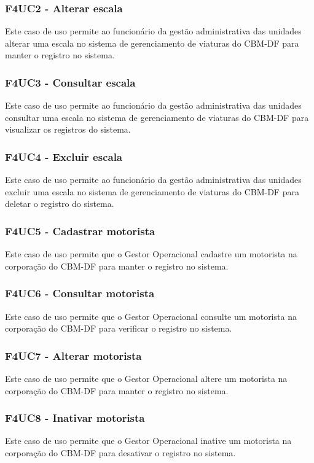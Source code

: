   \subsubsection{F4UC2 - Alterar escala}
Este caso de uso permite ao funcionário da gestão administrativa das unidades alterar uma escala no sistema de
gerenciamento de viaturas do CBM-DF para manter o registro no sistema.

  \subsubsection{F4UC3 - Consultar escala}
Este caso de uso permite ao funcionário da gestão administrativa das unidades consultar uma escala no sistema 
de gerenciamento de viaturas do CBM-DF para visualizar os registros do sistema.

  \subsubsection{F4UC4 - Excluir escala}
Este caso de uso permite ao funcionário da gestão administrativa das unidades  excluir uma escala no sistema 
de gerenciamento de viaturas do CBM-DF para deletar o registro do sistema.

  \subsubsection{F4UC5 - Cadastrar motorista}
Este caso de uso permite que o Gestor Operacional cadastre um motorista na corporação do CBM-DF para manter o registro no sistema.

  \subsubsection{F4UC6 - Consultar motorista}
Este caso de uso permite que o Gestor Operacional consulte um motorista na corporação do CBM-DF para verificar o registro no sistema.

  \subsubsection{F4UC7 - Alterar motorista}
Este caso de uso permite que o Gestor Operacional altere um motorista na corporação do CBM-DF para manter o registro no sistema.

  \subsubsection{F4UC8 - Inativar motorista}
Este caso de uso permite que o Gestor Operacional inative um motorista na corporação do CBM-DF para desativar o registro no sistema.

